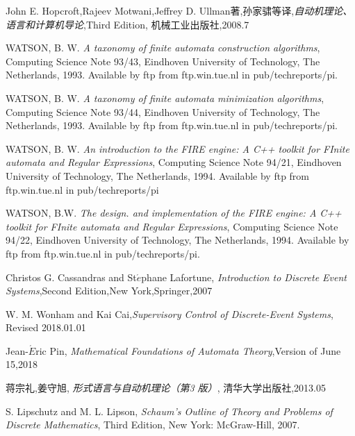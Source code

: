 \begin{thebibliography}{99}
	John E. Hopcroft,Rajeev Motwani,Jeffrey D. Ullman著,孙家骕等译,\textit{自动机理论、语言和计算机导论},Third Edition, 机械工业出版社,2008.7
	
	WATSON, B. W. \textit{A taxonomy of finite automata construction algorithms}, Computing Science Note 93/43, Eindhoven University of Technology, The Netherlands, 1993. Available by ftp from ftp.win.tue.nl in pub/techreports/pi.
	
	WATSON, B. W. \textit{A taxonomy of finite automata minimization algorithms}, Computing Science Note 93/44, Eindhoven University of Technology, The Netherlands, 1993. Available by ftp from ftp.win.tue.nl in pub/techreports/pi.
	
	WATSON, B. W. \textit{An introduction to the FIRE engine: A C++ toolkit for FInite automata and Regular Expressions}, Computing Science Note 94/21, Eindhoven University of Technology, The Netherlands, 1994. Available by ftp from ftp.win.tue.nl in pub/techreports/pi
	
	WATSON, B.W. \textit{The design. and implementation of the FIRE engine:	A C++ toolkit for FInite automata and Regular Expressions}, Computing Science Note 94/22, Eindhoven University of Technology, The Netherlands, 1994. Available by ftp from ftp.win.tue.nl in pub/techreports/pi.
	
	Christos G. Cassandras and St$\acute{e}$phane Lafortune, \textit{Introduction to Discrete Event Systems},Second Edition,New York,Springer,2007
	
	W. M. Wonham and Kai Cai,\textit{Supervisory Control of Discrete-Event Systems}, Revised 2018.01.01
	
	Jean-$\acute{E}$ric Pin, \textit{Mathematical Foundations of Automata Theory},Version of June 15,2018
	
	蒋宗礼,姜守旭, \textit{形式语言与自动机理论（第3 版）}, 清华大学出版社,2013.05
	
	
	S. Lipschutz and M. L. Lipson, \textit{Schaum's Outline of Theory and Problems of Discrete Mathematics}, Third Edition, New York: McGraw-Hill, 2007.
	

\end{thebibliography}
